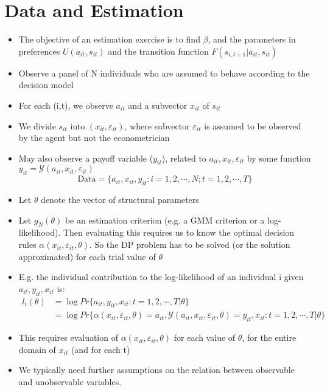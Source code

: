 \documentclass[11pt]{article}
\begin{document}
\section{Data and Estimation}

\begin{itemize}
    \item The objective of an estimation exercise is to find $\beta$, and the parameters in preferences $U(a_{it},s_{it})$ and the transition function $F(s_{i,t+1}|a_{it},s_{it})$
    \item Observe a panel of N individuals who are assumed to behave according to the decision model
    \item For each (i,t), we observe $a_{it}$ and a subvector $x_{it}$ of $s_{it}$
    \item We divide $s_{it}$ into $(x_{it},\varepsilon_{it})$, where subvector $\varepsilon_{it}$ is assumed to be observed by the agent but not the econometrician
    \item May also observe a payoff variable ($y_{it}$), related to $a_{it},x_{it},\varepsilon_{it}$ by some function $y_{it} = \mathcal{Y}(a_{it},x_{it},\varepsilon_{it})$
    \begin{equation}
        \text{Data} = \{a_{it},x_{it},y_{it}: i = 1,2,\cdots,N; t= 1,2,\cdots,T\}
    \end{equation}
    \item Let $\theta$ denote the vector of structural parameters
    \item Let $g_N(\theta)$ be an estimation criterion (e.g. a GMM criterion or a log-likelihood). Then evaluating this requires us to know the optimal decision rules $\alpha(x_{it},\varepsilon_{it},\theta)$. So the DP problem has to be solved (or the solution approximated) for each trial value of $\theta$
    \item E.g. the individual contribution to the log-likelihood of an individual i given $a_{it},y_{it},x_{it}$ is:
    \begin{align*}
        l_i(\theta) &= \log Pr\{a_{it},y_{it},x_{it}: t = 1,2,\cdots,T | \theta \} \\
        &= \log Pr\{\alpha(x_{it},\varepsilon_{it},\theta) = a_{it}, \mathcal{Y}(a_{it},x_{it},\varepsilon_{it},\theta) = y_{it},x_{it}: t = 1,2,\cdots,T | \theta\}
    \end{align*}
    \item This requires evaluation of $\alpha(x_{it},\varepsilon_{it},\theta)$ for each value of $\theta$, for the entire domain of $x_{it}$ (and for each t)
    \item We typically need further assumptions on the relation between observable and unobservable variables.
\end{itemize}
\end{document}
